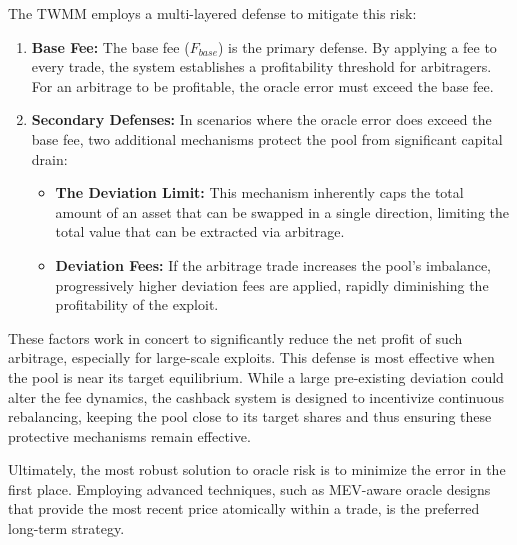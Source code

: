 The TWMM employs a multi-layered defense to mitigate this risk:

\begin{enumerate}
	\item \textbf{Base Fee:} The base fee ($F_{base}$) is the primary defense. By applying a fee to every trade, the system establishes a profitability threshold for arbitragers. For an arbitrage to be profitable, the oracle error must exceed the base fee.
	
	\item \textbf{Secondary Defenses:} In scenarios where the oracle error does exceed the base fee, two additional mechanisms protect the pool from significant capital drain:
	\begin{itemize}
		\item \textbf{The Deviation Limit:} This mechanism inherently caps the total amount of an asset that can be swapped in a single direction, limiting the total value that can be extracted via arbitrage.
		\item \textbf{Deviation Fees:} If the arbitrage trade increases the pool's imbalance, progressively higher deviation fees are applied, rapidly diminishing the profitability of the exploit.
	\end{itemize}
\end{enumerate}

These factors work in concert to significantly reduce the net profit of such arbitrage, especially for large-scale exploits. This defense is most effective when the pool is near its target equilibrium. While a large pre-existing deviation could alter the fee dynamics, the cashback system is designed to incentivize continuous rebalancing, keeping the pool close to its target shares and thus ensuring these protective mechanisms remain effective.

Ultimately, the most robust solution to oracle risk is to minimize the error in the first place. Employing advanced techniques, such as MEV-aware oracle designs that provide the most recent price atomically within a trade, is the preferred long-term strategy.